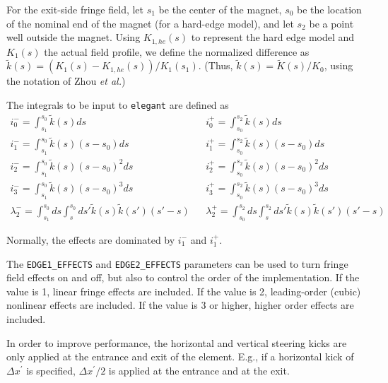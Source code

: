 For the exit-side fringe field, let $s_1$ be the center of the magnet, $s_0$ be the location of the nominal end of the magnet
(for a hard-edge model), and let $s_2$ be a point well outside the magnet.  
Using $K_{1,he}(s)$ to represent the hard edge model and $K_1(s)$ the actual field profile, we 
define the normalized difference as $\tilde{k}(s) = (K_1(s) - K_{1,he}(s))/K_1(s_1)$.  (Thus, $\tilde{k}(s) = \tilde{K}(s)/K_0$, using
the notation of Zhou {\em et al.})

The integrals to be input to {\tt elegant} are defined as 
\begin{eqnarray}
i_0^- = \int_{s_1}^{s_0} \tilde{k}(s) ds & & i_0^+ = \int_{s_0}^{s_2} \tilde{k}(s) ds \\
i_1^- = \int_{s_1}^{s_0} \tilde{k}(s) (s-s_0) ds & & i_1^+ = \int_{s_0}^{s_2} \tilde{k}(s) (s-s_0) ds \\
i_2^- = \int_{s_1}^{s_0} \tilde{k}(s) (s-s_0)^2 ds & & i_2^+ = \int_{s_0}^{s_2} \tilde{k}(s) (s-s_0)^2 ds \\
i_3^- = \int_{s_1}^{s_0} \tilde{k}(s) (s-s_0)^3 ds & & i_3^+ = \int_{s_0}^{s_2} \tilde{k}(s) (s-s_0)^3 ds \\
\lambda_2^- = \int_{s_1}^{s_0} ds \int_s^{s_0} ds\prime \tilde{k}(s) \tilde{k}(s\prime) (s\prime-s) & & 
\lambda_2^+ = \int_{s_0}^{s_2} ds \int_s^{s_2} ds\prime \tilde{k}(s) \tilde{k}(s\prime) (s\prime-s) 
\end{eqnarray}

Normally, the effects are dominated by $i_1^-$ and $i_1^+$.  

The \verb|EDGE1_EFFECTS| and \verb|EDGE2_EFFECTS| parameters can be used to turn fringe field effects on and off, but also
to control the order of the implementation.  If the value is 1, linear fringe effects are included.  If the value is 2, 
leading-order (cubic) nonlinear effects are included.  If the value is 3 or higher, higher order effects are included.

In order to improve performance, the horizontal and vertical steering kicks are only applied at the entrance and exit
of the element. E.g., if a horizontal kick of $\Delta x^\prime$ is specified, $\Delta x^\prime/2$ is applied at
the entrance and at the exit.

